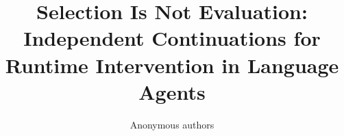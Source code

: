 \newcommand{\laplace}{\mathrm{Laplace}} %

\newcommand{\E}{\mathbb{E}}
\newcommand{\Ls}{\mathcal{L}}
\newcommand{\R}{\mathbb{R}}
\newcommand{\emp}{\tilde{p}}
\newcommand{\lr}{\alpha}
\newcommand{\reg}{\lambda}
\newcommand{\rect}{\mathrm{rectifier}}
\newcommand{\softmax}{\mathrm{softmax}}
\newcommand{\sigmoid}{\sigma}
\newcommand{\softplus}{\zeta}
\newcommand{\KL}{D_{\mathrm{KL}}}
\newcommand{\Var}{\mathrm{Var}}
\newcommand{\standarderror}{\mathrm{SE}}
\newcommand{\Cov}{\mathrm{Cov}}
\newcommand{\normlzero}{L^0}
\newcommand{\normlone}{L^1}
\newcommand{\normltwo}{L^2}
\newcommand{\normlp}{L^p}
\newcommand{\normmax}{L^\infty}

\newcommand{\parents}{Pa} %

\DeclareMathOperator*{\argmax}{arg\,max}
\DeclareMathOperator*{\argmin}{arg\,min}

\DeclareMathOperator{\sign}{sign}
\DeclareMathOperator{\Tr}{Tr}
\let\ab\allowbreak

\usepackage[T1]{fontenc}
\usepackage{amsmath,amssymb,booktabs,graphicx,microtype,multirow}
\usepackage[hidelinks]{hyperref}
\usepackage{url,pgf}
\def\mathdefault#1{#1}
\newcommand{\AlfPlanned}{384}
\newcommand{\SwPlanned}{57}
\newcommand{\AlfGroups}{96}
\newcommand{\SwGroups}{25}
\newcommand{\EligibleTotal}{406}
\newcommand{\AlfEligible}{355}
\newcommand{\SwEligible}{51}
\newcommand{\AlfEarly}{29}
\newcommand{\SwEarly}{6}
\newcommand{\ResultDigest}{d993f18595730f39ba2ca77159a21e18ef294ea4d7e24e12b81a4164ba276d28}

\newcommand{\EventPlanned}{593}
\newcommand{\EventEligible}{497}
\newcommand{\EventEarly}{96}
\newcommand{\EventGroups}{105}
\newcommand{\SchedEligible}{540}
\newcommand{\SchedEarly}{53}
\newcommand{\EventDigest}{666d9ba0de97b50b486efde0e794cec8fc61125907391868d9020810f0249158}
\newcommand{\SchedDigest}{4b30ecd9e61c9f496970750d07c2d9e08b6d0a95b2f9ebcf7062dfca5adc0d56}


\title{Selection Is Not Evaluation:\\Independent Continuations for Runtime Intervention in Language Agents}

\author{Anonymous authors}


\maketitle

